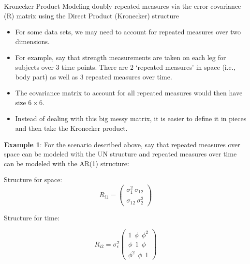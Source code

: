 \documentclass[
  9pt,
  ignorenonframetext,
]{beamer}
\begin{document}
\begin{frame}{Kronecker Product}
\protect\hypertarget{kronecker-product-1}{}
Modeling doubly repeated measures via the error covariance (R) matrix
using the Direct Product (Kronecker) structure

\begin{itemize}
\item
  For some data sets, we may need to account for repeated measures over
  two dimensions.
\item
  For example, say that strength measurements are taken on each leg for
  subjects over 3 time points. There are 2 `repeated measures' in space
  (i.e., body part) as well as 3 repeated measures over time.
\item
  The covariance matrix to account for all repeated measures would then
  have size \(6 \times 6\).
\item
  Instead of dealing with this big messy matrix, it is easier to define
  it in pieces and then take the Kronecker product.
\end{itemize}
\end{frame}

\begin{frame}{}
\protect\hypertarget{section}{}
\begin{block}{\textbf{Example 1}:}
\protect\hypertarget{example-1}{}
For the scenario described above, say that repeated measures over space
can be modeled with the UN structure and repeated measures over time can
be modeled with the AR(1) structure:

Structure for space: \[
R_{i1} = 
\begin{pmatrix}
\sigma_1^2\ \sigma_{12}\\
\sigma_{12}\ \sigma_2^2     
\end{pmatrix}
\]

Structure for time:

\[
R_{i2} = \sigma_\epsilon^2
\begin{pmatrix} 
1 \ \ \phi \ \ \phi^2 \\
\phi \ \ 1 \ \ \phi \\
\phi^2 \ \ \phi \ \ 1
\end{pmatrix}
\]
\end{block}
\end{frame}
\end{document}
